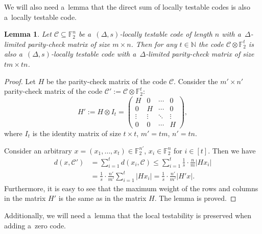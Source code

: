 \documentclass[conference]{IEEEtran}
\let\le\leqslant
\theoremstyle{plain}
\newtheorem{lemma}[theorem]{Lemma}
\theoremstyle{definition}
\theoremstyle{remark}
\newcommand{\NN}{\mathbb{N}}
\newcommand{\cC}{\mathcal{C}}
\newcommand{\F}{\mathbb{F}}
\begin{document}
We will also need a~lemma that the direct sum of locally testable codes is also a~locally testable code.

\begin{lemma}\label{lemma:sum-LTC}
    Let $\cC \subseteq \F_2^{n}$ be a~$(\Delta,s)$-locally testable code of length $n$ with a~$\Delta$-limited parity-check matrix of size $m \times n$. Then for any $t\in\NN$ the code $\cC\otimes \F_2^t$ is also a~$(\Delta,s)$-locally testable code with a~$\Delta$-limited parity-check matrix of size $tm \times tn$.
\end{lemma}
\begin{proof}
    Let $H$ be the parity-check matrix of the code $\cC$. Consider the $m'\times n'$ parity-check matrix of the code $\cC':=\cC\otimes \F_2^t$: 
    \[H':=H\otimes I_t=\begin{pmatrix}
        H & 0 & \cdots & 0\\ 
        0 & H & \cdots & 0\\
        \vdots&\vdots&\ddots&\vdots\\
        0&0&\cdots&H
    \end{pmatrix},\]
    where $I_t$ is the identity matrix of size $t\times t$, $m'=tm$, $n'=tn$.

    Consider an arbitrary $x=(x_1,\ldots,x_t)\in \F_2^{n'}$, $x_i\in \F_2^{n}$ for $i\in[t]$. 
    Then we have
    \begin{align*}
        d(x,\cC')&=\sum_{i=1}^t d(x_i,\cC)
        \le \sum_{i=1}^t\frac{1}{s}\cdot\frac{n}{m}|H x_i|\\
        &= \frac{1}{s}\cdot\frac{n'}{m'}\sum_{i=1}^t|H x_i|
        = \frac{1}{s}\cdot\frac{n'}{m'}|H' x|.
    \end{align*}
    Furthermore, it is easy to see that the maximum weight of the rows and columns in the matrix $H'$ is the same as in the matrix $H$.   
    The lemma is proved.
\end{proof}

Additionally, we will need a~lemma that the local testability is preserved when adding a~zero code.
\end{document}
